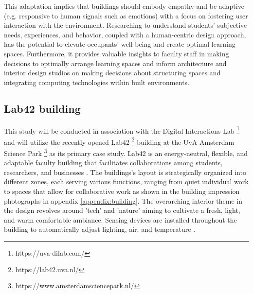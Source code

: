 This adaptation implies that buildings should embody empathy \cite{empathic} and be adaptive (e.g. responsive to human signals such as emotions) with a focus on fostering user interaction with the environment. Researching to understand students' subjective needs, experiences, and behavior, coupled with a human-centric design approach, has the potential to elevate occupants' well-being and create optimal learning spaces. Furthermore, it provides valuable insights to faculty staff in making decisions to optimally arrange learning spaces and inform architecture and interior design studios on making decisions about structuring spaces and integrating computing technologies within built environments.

\subsection{Lab42 building}

This study will be conducted in association with the Digital Interactions Lab \footnote{https://uva-dilab.com/} and will utilize the recently opened Lab42 \footnote{https://lab42.uva.nl/} building at the UvA Amsterdam Science Park \footnote{https://www.amsterdamsciencepark.nl/} as its primary case study. Lab42 is an energy-neutral, flexible, and adaptable faculty building that facilitates collaborations among students, researchers, and businesses \cite{crouwel}. The buildings's layout is strategically organized into different zones, each serving various functions, ranging from quiet individual work to spaces that allow for collaborative work as shown in the building impression photographs in appendix \ref{appendix:building}. The overarching interior theme in the design revolves around 'tech' and 'nature' aiming to cultivate a fresh, light, and warm comfortable ambiance. Sensing devices are installed throughout the building to automatically adjust lighting, air, and temperature \cite{faculty}.